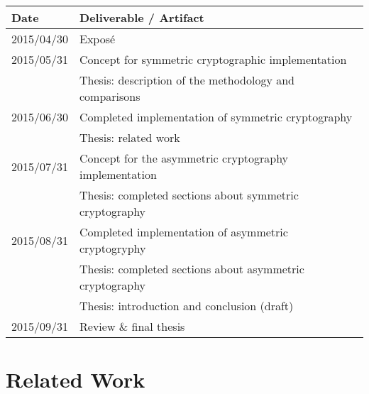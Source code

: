 \documentclass[a4paper,12pt]{article}
\begin{document}
\begin{table}[h]
\begin{tabular}{ll}
\textbf{Date} & \textbf{Deliverable / Artifact}                                           \\ \hline
2015/04/30    & Exposé                                                                    \\ \hline
2015/05/31    & Concept for symmetric cryptographic implementation                        \\
              & Thesis: description of the methodology and comparisons                    \\ \hline
2015/06/30    & Completed implementation of symmetric cryptography                        \\
              & Thesis: related work                                                      \\ \hline
2015/07/31    & Concept for the asymmetric cryptography implementation                    \\
              & Thesis: completed sections about symmetric cryptography                   \\ \hline
2015/08/31    & Completed implementation of asymmetric cryptogryphy                       \\
              & Thesis: completed sections about asymmetric cryptography                  \\
              & Thesis: introduction and conclusion (draft)                               \\ \hline
2015/09/31    & Review \& final thesis                                                   
\end{tabular}
\end{table}

\section{Related Work}

\begingroup
\renewcommand{\section}[2]{}
\renewcommand{\refname}{}
\nocite{*}


\endgroup
\end{document}
